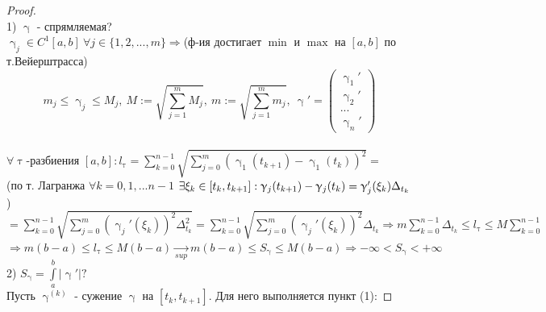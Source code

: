 \documentclass[matan]{subfiles}
\begin{document}
  \begin{proof}
      \\
      1) $\upgamma$ - спрямляемая?
      \\
      $\upgamma_j \in C^1[a,b]\ \forall j \in \{1,2,...,m\} \Rightarrow$(ф-ия достигает $\min$ и $\max$ на $[a,b]$ по т.Вейерштрасса)
      $$m_j \leqslant \upgamma_j \leqslant M_j,\ M := \sqrt{\sum\limits_{j=1}^m M_j},\ m := \sqrt{\sum\limits_{j=1}^m m_j},\ \upgamma' = \begin{pmatrix}
        \upgamma_1'\\
        \upgamma_2'\\
        ...\\
        \upgamma_n'
      \end{pmatrix}$$
      \\
      $\forall \uptau$-разбиения $[a,b]: l_\uptau = \sum\limits_{k=0}^{n-1} \sqrt{\sum\limits_{j=0}^m (\upgamma_1(t_{k+1}) - \upgamma_1(t_k))^2} = $
      \\
      (по т. Лагранжа $\forall k = 0,1,...n-1$ $\exists \xi_k \in [t_k, t_{k+1}]: \upgamma_j(t_{k+1}) - \upgamma_j(t_k) = \upgamma_j'(\xi_k) \Delta_{t_k}$)
      \\
      $= \sum\limits_{k=0}^{n-1} \sqrt{\sum\limits_{j=0}^m (\upgamma_j'(\xi_k))^2 \Delta_{t_k}^2} = \sum\limits_{k=0}^{n-1} \sqrt{\sum\limits_{j=0}^m (\upgamma_j'(\xi_k))^2} \Delta_{t_k} \Rightarrow m \sum\limits_{k=0}^{n-1} \Delta_{t_k} \leqslant l_\uptau \leqslant M \sum\limits_{k=0}^{n-1}$
      \\
      $\Rightarrow m (b-a) \leqslant l_\uptau \leqslant M (b-a) \underset{sup}{\rightarrow} m (b-a) \leqslant S_\upgamma \leqslant M (b-a) \Rightarrow -\infty < S_\upgamma < +\infty$
      \\
      2) $S_{\upgamma} = \int\limits_a^b |\upgamma'|?$
      \\
      Пусть $\upgamma^{(k)}$ - сужение $\upgamma$ на $[t_k,t_{k+1}]$. Для него выполняется пункт (1):


\end{proof}
\end{document}
